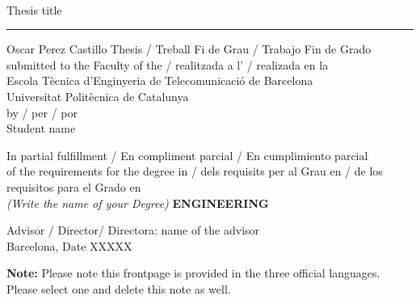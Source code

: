 \documentclass[a4paper,12pt]{article}
\begin{document}

\thispagestyle{empty}
\begin{center}
{\sffamily 
{}\\
\vspace{1cm}
{\Huge Thesis title}\\
\vspace{0.5cm}
{\color{black}\hrule height 1pt}
\vspace{1cm}
{\large{Oscar Perez Castillo Thesis / Treball Fi de Grau / Trabajo Fin de Grado\\
submitted to the Faculty of the / realitzada a l' / realizada en la \\
Escola T\`ecnica d'Enginyeria de Telecomunicaci\'o de Barcelona \\
Universitat Polit\`ecnica de Catalunya \\
by / per / por \\
\vspace{0.5cm}
Student name}}

\vspace{1.5cm}

{In partial fulfillment / En compliment parcial / En cumplimiento parcial\\
of the requirements for the degree in / dels requisits per al Grau en / de los requisitos para el Grado en \\
\textit{(Write the name of your Degree)} \textbf{ENGINEERING}}

\vspace{2cm}

{{Advisor / Director/ Directora: name of the advisor\\}}
{{Barcelona, Date XXXXX}}

\vspace{2cm}

{\color{red} \textbf{Note:} Please note this frontpage is provided in the three official languages. Please select one and delete this note as well.}
\thispagestyle{alim}
}

\end{center}
\end{document}
